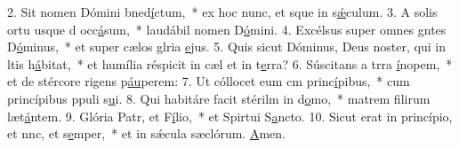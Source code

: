 2. Sit nomen Dómini bned\uline{í}ctum,~* ex hoc nunc, et sque in s\uline{ǽ}culum.
3. A solis ortu usque d occ\uline{á}sum,~* laudábil nomen D\uline{ó}mini.
4. Excélsus super omnes gntes D\uline{ó}minus,~* et super cælos glria \uline{e}jus.
5. Quis sicut Dóminus, Deus noster, qui in ltis h\uline{á}bitat,~* et humília réspicit in cæl et in t\uline{e}rra?
6. Súscitans a trra \uline{í}nopem,~* et de stércore rigens p\uline{áu}perem:
7. Ut cóllocet eum cm princ\uline{í}pibus,~* cum princípibus ppuli s\uline{u}i.
8. Qui habitáre facit stérilm in d\uline{o}mo,~* matrem filirum læt\uline{á}ntem.
9. Glória Patr, et F\uline{í}lio,~* et Spirtui S\uline{a}ncto.
10. Sicut erat in princípio, et nnc, et s\uline{e}mper,~* et in sǽcula sæclórum. \uline{A}men.
